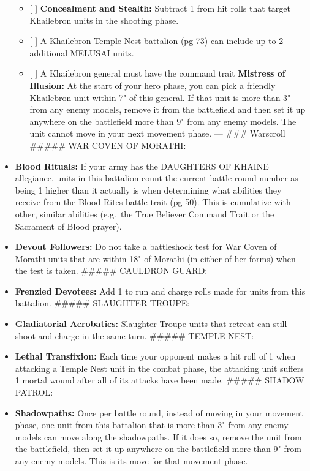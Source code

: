 \begin{itemize}
  \begin{itemize}
  \tightlist
  \item
    {[} {]} \textbf{Concealment and Stealth:} Subtract 1 from hit rolls
    that target Khailebron units in the shooting phase.
  \item
    {[} {]} A Khailebron Temple Nest battalion (pg 73) can include up to
    2 additional MELUSAI units.
  \item
    {[} {]} A Khailebron general must have the command trait
    \textbf{Mistress of Illusion:} At the start of your hero phase, you
    can pick a friendly Khailebron unit within 7" of this general. If
    that unit is more than 3" from any enemy models, remove it from the
    battlefield and then set it up anywhere on the battlefield more than
    9" from any enemy models. The unit cannot move in your next movement
    phase. --- \#\#\# Warscroll \#\#\#\#\# WAR COVEN OF MORATHI:
  \end{itemize}
\item
  \textbf{Blood Rituals:} If your army has the DAUGHTERS OF KHAINE
  allegiance, units in this battalion count the current battle round
  number as being 1 higher than it actually is when determining what
  abilities they receive from the Blood Rites battle trait (pg 50). This
  is cumulative with other, similar abilities (e.g.~the True Believer
  Command Trait or the Sacrament of Blood prayer).
\item
  \textbf{Devout Followers:} Do not take a battleshock test for War
  Coven of Morathi units that are within 18" of Morathi (in either of
  her forms) when the test is taken. \#\#\#\#\# CAULDRON GUARD:
\item
  \textbf{Frenzied Devotees:} Add 1 to run and charge rolls made for
  units from this battalion. \#\#\#\#\# SLAUGHTER TROUPE:
\item
  \textbf{Gladiatorial Acrobatics:} Slaughter Troupe units that retreat
  can still shoot and charge in the same turn. \#\#\#\#\# TEMPLE NEST:
\item
  \textbf{Lethal Transfixion:} Each time your opponent makes a hit roll
  of 1 when attacking a Temple Nest unit in the combat phase, the
  attacking unit suffers 1 mortal wound after all of its attacks have
  been made. \#\#\#\#\# SHADOW PATROL:
\item
  \textbf{Shadowpaths:} Once per battle round, instead of moving in your
  movement phase, one unit from this battalion that is more than 3" from
  any enemy models can move along the shadowpaths. If it does so, remove
  the unit from the battlefield, then set it up anywhere on the
  battlefield more than 9" from any enemy models. This is its move for
  that movement phase.
\end{itemize}

